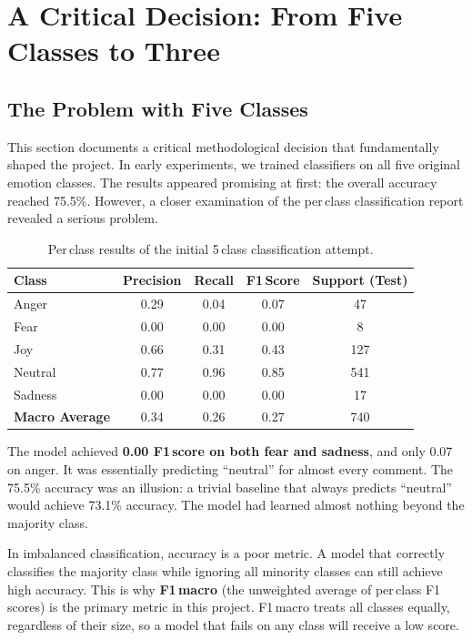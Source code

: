 \documentclass[12pt,a4paper,twoside]{article}
\theoremstyle{definition}
\begin{document}
\section{A Critical Decision: From Five Classes to Three}
\label{sec:consolidation}

\subsection{The Problem with Five Classes}

This section documents a critical methodological decision that fundamentally shaped the project. In early experiments, we trained classifiers on all five original emotion classes. The results appeared promising at first: the overall accuracy reached 75.5\%. However, a closer examination of the per\,class classification report revealed a serious problem.

\begin{table}[h]
\centering
\caption{Per\,class results of the initial 5\,class classification attempt.}
\label{tab:5class-fail}
\begin{tabular}{lcccc}
\toprule
\textbf{Class} & \textbf{Precision} & \textbf{Recall} & \textbf{F1\,Score} & \textbf{Support (Test)} \\
\midrule
Anger & 0.29 & 0.04 & 0.07 & 47 \\
Fear & 0.00 & 0.00 & 0.00 & 8 \\
Joy & 0.66 & 0.31 & 0.43 & 127 \\
Neutral & 0.77 & 0.96 & 0.85 & 541 \\
Sadness & 0.00 & 0.00 & 0.00 & 17 \\
\midrule
\textbf{Macro Average} & 0.34 & 0.26 & 0.27 & 740 \\
\bottomrule
\end{tabular}
\end{table}

The model achieved \textbf{0.00 F1\,score on both fear and sadness}, and only 0.07 on anger. It was essentially predicting ``neutral'' for almost every comment. The 75.5\% accuracy was an illusion: a trivial baseline that always predicts ``neutral'' would achieve 73.1\% accuracy. The model had learned almost nothing beyond the majority class.

\begin{notebox}
In imbalanced classification, accuracy is a poor metric. A model that correctly classifies the majority class while ignoring all minority classes can still achieve high accuracy. This is why \textbf{F1\,macro} (the unweighted average of per\,class F1 scores) is the primary metric in this project. F1\,macro treats all classes equally, regardless of their size, so a model that fails on any class will receive a low score.
\end{notebox}
\end{document}
